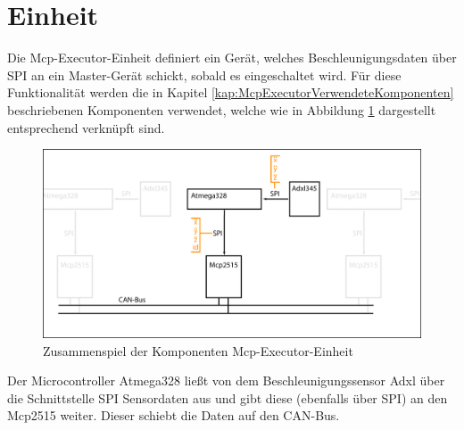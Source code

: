 \section{Einheit}
\label{kap:McpExecutorEinheitMain}
Die Mcp-Executor-Einheit definiert ein Gerät, welches Beschleunigungsdaten über SPI an ein Master-Gerät schickt, sobald es eingeschaltet wird.
\newline
Für diese Funktionalität werden die in Kapitel \ref{kap:McpExecutorVerwendeteKomponenten} beschriebenen Komponenten verwendet, welche wie in Abbildung \ref{fig:Mcp2515EinheitZusammenspiel} dargestellt entsprechend verknüpft sind.

	\begin{figure}[H]
		\centering
		\includegraphics[width=1.0\linewidth]{Bilder/Mcp2515EinheitZusammenspiel}
		\caption[Zusammenspiel der Komponenten Mcp-Executor-Einheit]{Zusammenspiel der Komponenten Mcp-Executor-Einheit}
		\label{fig:Mcp2515EinheitZusammenspiel}
	\end{figure}
	
Der Microcontroller Atmega328 ließt von dem Beschleunigungssensor Adxl über die Schnittstelle SPI Sensordaten aus und gibt diese (ebenfalls über SPI) an den Mcp2515 weiter. Dieser schiebt die Daten auf den CAN-Bus.
	





